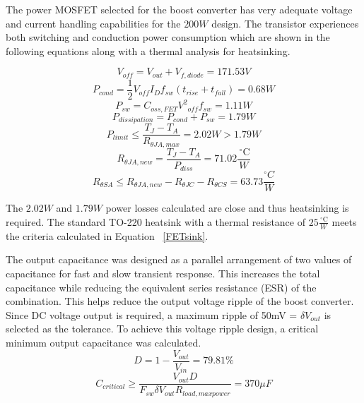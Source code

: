 The power MOSFET selected for the boost converter has very adequate voltage and current handling capabilities for the $200W$ design. The transistor experiences both switching and conduction power consumption which are shown in the following equations along with a thermal analysis for heatsinking.

\begin{equation}
V_{off} = V_{out} + V_{f,diode} = 171.53V
\end{equation} 
\begin{equation}
P_{cond} = \frac{1}{2}V_{off}I_Df_{sw}(t_{rise}+t_{fall}) = 0.68W
\end{equation}
\begin{equation}
P_{sw} = C_{oss,FET}{V^2}_{off}f_{sw} = 1.11W
\end{equation}
\begin{equation}
P_{dissipation} = P_{cond} + P_{sw} = 1.79W
\end{equation}
\begin{equation}
P_{limit} \leq \frac{T_J-T_A}{R_{\theta JA,max}} = 2.02W > 1.79W
\end{equation}
\begin{equation}
R_{\theta JA,new} = \frac{T_J-T_A}{P_{diss}} = 71.02\frac{\,^{\circ}\mathrm{C}}{W}
\end{equation}
\begin{equation}
R_{\theta SA} \leq R_{\theta JA,new} - R_{\theta JC} - R_{\theta CS} = 63.73\frac{^{\circ}{C}}{W}
\label{FETsink}
\end{equation}

The $2.02W $ and $ 1.79W$ power losses calculated are close and thus heatsinking is required. The standard TO-220 heatsink with a thermal resistance of $25\frac{\,^{\circ}\mathrm{C}}{W}$ meets the criteria calculated in Equation ~\ref{FETsink}.

The output capacitance was designed as a parallel arrangement of two values of capacitance for fast and slow transient response. This increases the total capacitance while reducing the equivalent series resistance (ESR) of the combination. This helps reduce the output voltage ripple of the boost converter. Since DC voltage output is required, a maximum ripple of 50mV = $\delta V_{out}$ is selected as the tolerance. To achieve this voltage ripple design, a critical minimum output capacitance was calculated.\cite{hasaneen}
\begin{equation}
D = 1 - \frac{V_{out}}{V_{in}} = 79.81\% 
\end{equation}
\begin{equation}
C_{critical} \ge \frac{V_{out}D}{F_{sw}\delta V_{out}R_{load,maxpower}} = 370 \mu F
\end{equation}

